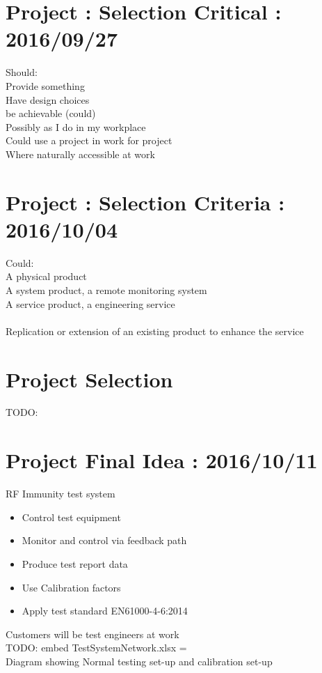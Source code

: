 \documentclass[a4paper]{article}
\begin{document}
\section{Project : Selection Critical : 2016/09/27}
Should:\\
Provide something\\
Have design choices\\
be achievable (could)\\
Possibly as I do in my workplace\\
Could use a project in work for project\\
 Where naturally accessible at work\\

\section{Project : Selection Criteria : 2016/10/04}
Could:\\
A physical product\\
A system product, a remote monitoring system\\
A service product, a engineering service\\
\\
Replication or extension of an existing product to enhance the service\\

\section{Project Selection}
TODO:\\

\newpage

\section{Project Final Idea : 2016/10/11}
RF Immunity test system\\
\begin{itemize}
  \item Control test equipment
  \item Monitor and control via feedback path
  \item Produce test report data
  \item Use Calibration factors
  \item Apply test standard \gls{EN61000-4-6:2014}
\end{itemize}
Customers will be test engineers at work\\
TODO: embed TestSystemNetwork.xlsx  = \\
Diagram showing Normal testing set-up and calibration set-up\\
\end{document}
